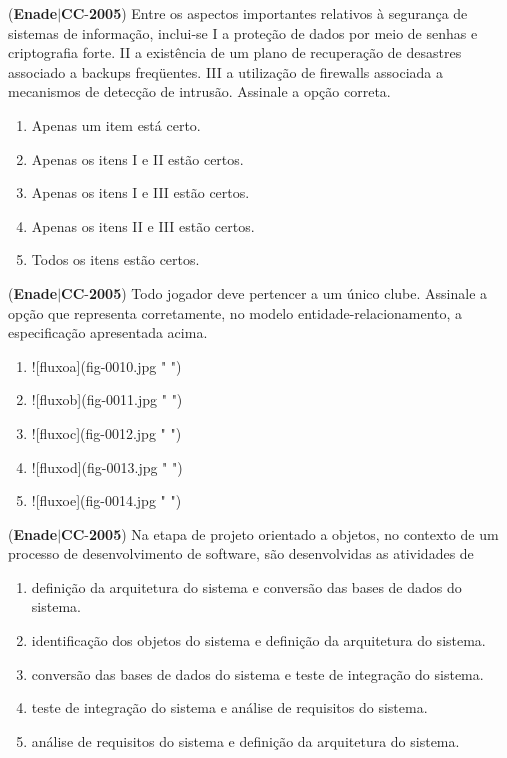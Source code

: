\documentclass{exam}
\begin{document}
\begin{questions}
\begin{enumerate}[label=\alph*)]
	\end{enumerate}

\question (\textbf{Enade}$|$\textbf{CC}-\textbf{2005}) Entre os aspectos importantes relativos à segurança de sistemas
de informação, inclui-se
I a proteção de dados por meio de senhas e criptografia forte.
II a existência de um plano de recuperação de desastres
associado a backups freqüentes.
III a utilização de firewalls associada a mecanismos de
detecção de intrusão.
Assinale a opção correta.
	\begin{enumerate}[label=\alph*)]
		\item  Apenas um item está certo.
		\item  Apenas os itens I e II estão certos.
		\item  Apenas os itens I e III estão certos.
		\item  Apenas os itens II e III estão certos.
		\item  Todos os itens estão certos.

	\end{enumerate}

\question (\textbf{Enade}$|$\textbf{CC}-\textbf{2005}) Todo jogador deve pertencer a um único clube.
Assinale a opção que representa corretamente, no modelo
entidade-relacionamento, a especificação apresentada acima.
	\begin{enumerate}[label=\alph*)]
		\item  ![fluxoa](fig-0010.jpg " ")
		\item  ![fluxob](fig-0011.jpg " ")
		\item  ![fluxoc](fig-0012.jpg " ")
		\item  ![fluxod](fig-0013.jpg " ")
		\item  ![fluxoe](fig-0014.jpg " ")

	\end{enumerate}

\question (\textbf{Enade}$|$\textbf{CC}-\textbf{2005}) Na etapa de projeto orientado a objetos, no contexto de um
processo de desenvolvimento de software, são desenvolvidas as
atividades de
	\begin{enumerate}[label=\alph*)]
		\item  definição da arquitetura do sistema e conversão das bases de
dados do sistema.
		\item  identificação dos objetos do sistema e definição da
arquitetura do sistema.
		\item  conversão das bases de dados do sistema e teste de
integração do sistema.
		\item  teste de integração do sistema e análise de requisitos do
sistema.
		\item  análise de requisitos do sistema e definição da arquitetura
do sistema.


\end{enumerate}
\end{questions}
\end{document}
